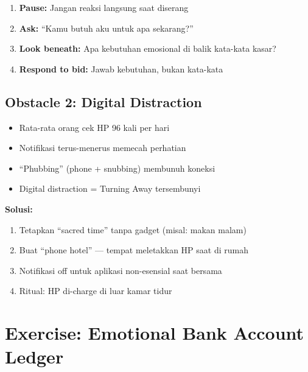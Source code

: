 \begin{tipbox}
\begin{enumerate}
    \item \textbf{Pause:} Jangan reaksi langsung saat diserang
    \item \textbf{Ask:} ``Kamu butuh aku untuk apa sekarang?''
    \item \textbf{Look beneath:} Apa kebutuhan emosional di balik kata-kata kasar?
    \item \textbf{Respond to bid:} Jawab kebutuhan, bukan kata-kata
\end{enumerate}
\end{tipbox}

\subsection{Obstacle 2: Digital Distraction}

\begin{warningbox}
\begin{itemize}
    \item Rata-rata orang cek HP 96 kali per hari
    \item Notifikasi terus-menerus memecah perhatian
    \item ``Phubbing'' (phone + snubbing) membunuh koneksi
    \item Digital distraction = Turning Away tersembunyi
\end{itemize}
\end{warningbox}

\textbf{Solusi:}
\begin{enumerate}
    \item Tetapkan ``sacred time'' tanpa gadget (misal: makan malam)
    \item Buat ``phone hotel'' --- tempat meletakkan HP saat di rumah
    \item Notifikasi off untuk aplikasi non-esensial saat bersama
    \item Ritual: HP di-charge di luar kamar tidur
\end{enumerate}

\section{Exercise: Emotional Bank Account Ledger}

